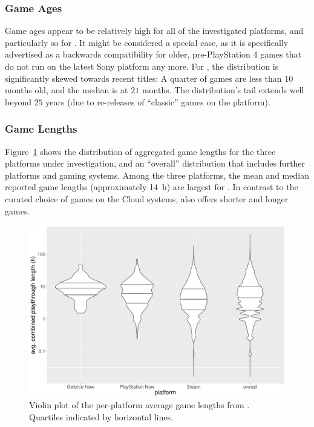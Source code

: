 \subsubsection{Game Ages}

Game ages appear to be relatively high for all of the investigated
platforms, and particularly so for \psnow. It might be considered a
special case, as it is specifically advertised as a backwards
compatibility for older, pre-PlayStation 4 games that do not run on the
latest Sony platform any more. For \steam, the distribution is
significantly skewed towards recent titles: A quarter of games are less
than $10$ months old, and the median is at $21$ months. The
distribution's tail extends well beyond $25$ years (due to re-releases
of ``classic'' games on the platform).


\subsubsection{Game Lengths}
Figure~\ref{fig:gamelengths-violin} shows the distribution of aggregated
game lengths for the three platforms under investigation, and an
``overall'' distribution that includes further platforms and gaming
systems. Among the three platforms, the mean and median reported game
lengths (approximately \SI{14}{\hour}) are largest for \gfnow. In
contrast to the curated choice of games on the Cloud systems, \steam
also offers shorter and longer games.


\begin{figure}[!t]
	\centering
	\includegraphics[width=1.0\columnwidth]{images/gamelengths-by-platform-violin.pdf}
	\caption{Violin plot of the per-platform average game lengths from \hltb. Quartiles indicated by horizontal lines.}
\label{fig:gamelengths-violin}
\end{figure}



